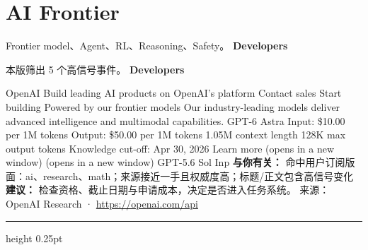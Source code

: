 \documentclass[10.5pt]{ctexart}
\begin{document}
\section*{AI Frontier}
{\color{ormuted} Frontier model、Agent、RL、Reasoning、Safety。}
\vspace{2mm}
{\LARGE\bfseries Developers}\par
\vspace{1mm}
{\color{ormuted} 本版筛出 5 个高信号事件。}
\vspace{3mm}
{\Large\bfseries Developers}\par
OpenAI Build leading AI products on OpenAI’s platform Contact sales Start building Powered by our frontier models Our industry-leading models deliver advanced intelligence and multimodal capabilities. GPT-6 Astra Input: \$10.00 per 1M tokens Output: \$50.00 per 1M tokens 1.05M context length 128K max output tokens Knowledge cut-off: Apr 30, 2026 Learn more (opens in a new window) (opens in a new window) GPT-5.6 Sol Inp
\textbf{与你有关：} 命中用户订阅版面：ai、research、math；来源接近一手且权威度高；标题/正文包含高信号变化
\textbf{建议：} 检查资格、截止日期与申请成本，决定是否进入任务系统。
{\footnotesize\color{ormuted} 来源：OpenAI Research · \url{https://openai.com/api}}
\vspace{4mm}
\hrule height 0.25pt
\vspace{3mm}
\end{document}
